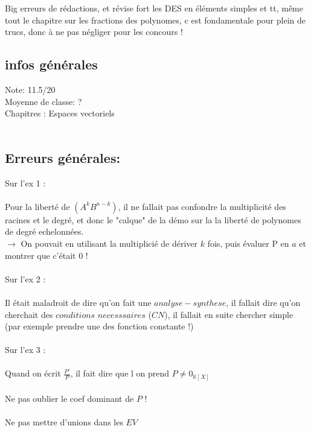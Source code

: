 \documentclass{book}
\begin{document}
\begin{tcolorbox}[width={14cm},colback={yellow!20!white},title={\textbf{Commentaire générale sur ce DM}},colbacktitle=red!40!white,coltitle=black]    
	Big erreurs de rédactions, et révise fort les DES en éléments simples et tt, même tout le chapitre sur les fractions des polynomes, c est fondamentale pour plein de trucs, donc à ne pas négliger pour les concours !
\end{tcolorbox}


\subsection{infos générales}

Note: 11.5/20\\
Moyenne de classe: ? \\

Chapitres : Espaces vectoriels \\ \\

\subsection{Erreurs générales: } 

Sur l'ex 1 : \\ \\
Pour la liberté de $(A^k B^{n-k})$, il ne fallait pas confondre la multiplicité des racines et le degré, et donc le "calque" de la démo sur la la liberté de polynomes de degré echelonnées. \\

$\rightarrow$ On pouvait en utilisant la multiplicié de dériver $k$ fois, puis évaluer P en $a$ et montrer que c'était 0 ! \\ \\


Sur l'ex 2 : \\ \\
Il était maladroit de dire qu'on fait une $analyse-synthese$, il fallait dire qu'on cherchait des $conditions$ $necesssaires$ ($CN$), il fallait en suite chercher simple (par exemple prendre une des fonction constante !) \\ \\


Sur l'ex 3 : \\ \\
Quand on écrit $\frac{P'}{P}$, il fait dire que l on prend $P \not= 0_{\mathbb{K}[X]}$ \\ \\
Ne pas oublier le coef dominant de $P$ ! \\ \\
Ne pas mettre d'unions dans les $EV$ \\ \\
\end{document}

